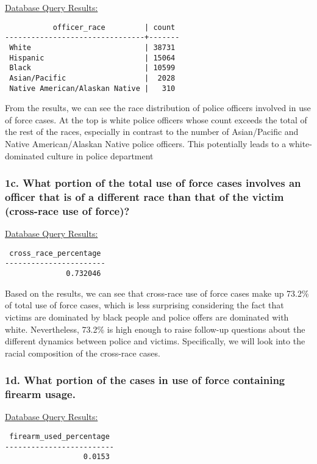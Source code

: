 \documentclass[10pt]{article}
\begin{document}
\underline{Database Query Results:}

\begin{verbatim}
           officer_race         | count
--------------------------------+-------
 White                          | 38731
 Hispanic                       | 15064
 Black                          | 10599
 Asian/Pacific                  |  2028
 Native American/Alaskan Native |   310
\end{verbatim}

From the results, we can see the race distribution of police officers involved in use of force cases. At the top is white police officers whose count exceeds the total of the rest of the races, especially in contrast to the number of Asian/Pacific and Native American/Alaskan Native police officers. This potentially leads to a white-dominated culture in police department


\subsubsection*{1c. What portion of the total use of force cases involves an officer that is of a different race than that of the victim (cross-race use of force)?}

\underline{Database Query Results:}

\begin{verbatim}
 cross_race_percentage
-----------------------
              0.732046
\end{verbatim}

Based on the results, we can see that cross-race use of force cases make up 73.2\% of total use of force cases, which is less surprising considering the fact that victims are dominated by black people and police offers are dominated with white. Nevertheless, 73.2\% is high enough to raise follow-up questions about the different dynamics between police and victims. Specifically, we will look into the racial composition of the cross-race cases.


\subsubsection*{1d. What portion of the cases in use of force containing firearm usage.}

\underline{Database Query Results:}

\begin{verbatim}
 firearm_used_percentage
-------------------------
                  0.0153
\end{verbatim}
\end{document}
